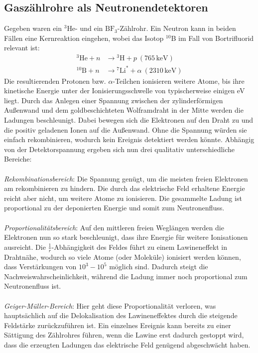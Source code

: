 \documentclass[german, parskip=full]{scrartcl}
\newcommand{\tecxt}{}
\begin{document}
\subsection{Gaszählrohre als Neutronendetektoren}
Gegeben waren ein ${}^3$He- und ein $\tecxt\text{BF}_3$-Zählrohr. Ein Neutron kann in beiden Fällen eine Kernreaktion eingehen, wobei das Isotop ${}^{10}$B im Fall von Bortrifluorid relevant ist:
\begin{align*}
{}^3\tecxt\text{He}+n&\longrightarrow {}^3\tecxt\text{H} +p\ (765\,\tecxt\text{keV})\\
{}^{10}\tecxt\text{B}+n&\longrightarrow {}^7\tecxt\text{Li}^\ast +\alpha\ (2310\,\tecxt\text{keV})
\end{align*}
Die resultierenden Protonen bzw. $\alpha$-Teilchen ionisieren weitere Atome, bis ihre kinetische Energie unter der Ionisierungsschwelle von typischerweise einigen eV liegt. Durch das Anlegen einer Spannung zwischen der zylinderförmigen Außenwand und dem goldbeschichteten Wolframdraht in der Mitte werden die Ladungen beschleunigt. Dabei bewegen sich die Elektronen auf den Draht zu und die positiv geladenen Ionen auf die Außenwand. Ohne die Spannung würden sie einfach rekombinieren, wodurch kein Ereignis detektiert werden könnte. Abhängig von der Detektorspannung ergeben sich nun drei qualitativ unterschiedliche Bereiche:\\ \\
\textsl{Rekombinationsbereich}: Die Spannung genügt, um die meisten freien Elektronen am rekombinieren zu hindern. Die durch das elektrische Feld erhaltene Energie reicht aber nicht, um weitere Atome zu ionisieren. Die gesammelte Ladung ist proportional zu der deponierten Energie und somit zum Neutronenfluss.\\ \\
\textsl{Proportionalitätsbereich}: Auf den mittleren freien Weglängen werden die Elektronen nun so stark beschleunigt, dass ihre Energie für weitere Ionisationen ausreicht. Die $\frac{1}{r}$-Abhängigkeit des Feldes führt zu einem Lawineneffekt in Drahtnähe, wodurch so viele Atome (oder Moleküle) ionisiert werden können, dass Verstärkungen von $10^3-10^5$ möglich sind. Dadurch steigt die Nachweiswahrscheinlichkeit, während die Ladung immer noch proportional zum Neutronenfluss ist.\\ \\
\textsl{Geiger-Müller-Bereich}: Hier geht diese Proportionalität verloren, was hauptsächlich auf die Delokalisation des Lawineneffektes durch die steigende Feldstärke zurückzuführen ist. Ein einzelnes Ereignis kann bereits zu einer Sättigung des Zählrohres führen, wenn die Lawine erst dadurch gestoppt wird, dass die erzeugten Ladungen das elektrische Feld genügend abgeschwächt haben.
\end{document}
